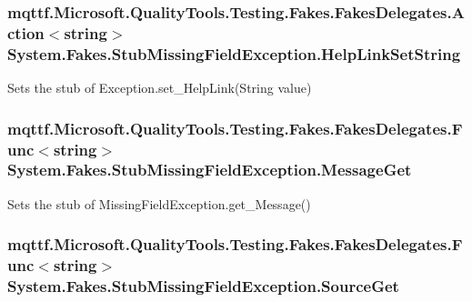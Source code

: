 \hypertarget{class_system_1_1_fakes_1_1_stub_missing_field_exception_afae60415c03d6cf8f49eecf19ad7dfa4}{
\subsubsection[{Help\-Link\-Set\-String}]{\setlength{\rightskip}{0pt plus 5cm}mqttf.\-Microsoft.\-Quality\-Tools.\-Testing.\-Fakes.\-Fakes\-Delegates.\-Action$<$string$>$ System.\-Fakes.\-Stub\-Missing\-Field\-Exception.\-Help\-Link\-Set\-String}}\label{class_system_1_1_fakes_1_1_stub_missing_field_exception_afae60415c03d6cf8f49eecf19ad7dfa4}


Sets the stub of Exception.\-set\-\_\-\-Help\-Link(\-String value)

\hypertarget{class_system_1_1_fakes_1_1_stub_missing_field_exception_ac5da13354c2f52311120a1d8d7478d42}{
\subsubsection[{Message\-Get}]{\setlength{\rightskip}{0pt plus 5cm}mqttf.\-Microsoft.\-Quality\-Tools.\-Testing.\-Fakes.\-Fakes\-Delegates.\-Func$<$string$>$ System.\-Fakes.\-Stub\-Missing\-Field\-Exception.\-Message\-Get}}\label{class_system_1_1_fakes_1_1_stub_missing_field_exception_ac5da13354c2f52311120a1d8d7478d42}


Sets the stub of Missing\-Field\-Exception.\-get\-\_\-\-Message()

\hypertarget{class_system_1_1_fakes_1_1_stub_missing_field_exception_a08ec787aeca9e8c300e59db4c8958b0a}{
\subsubsection[{Source\-Get}]{\setlength{\rightskip}{0pt plus 5cm}mqttf.\-Microsoft.\-Quality\-Tools.\-Testing.\-Fakes.\-Fakes\-Delegates.\-Func$<$string$>$ System.\-Fakes.\-Stub\-Missing\-Field\-Exception.\-Source\-Get}}\label{class_system_1_1_fakes_1_1_stub_missing_field_exception_a08ec787aeca9e8c300e59db4c8958b0a}



